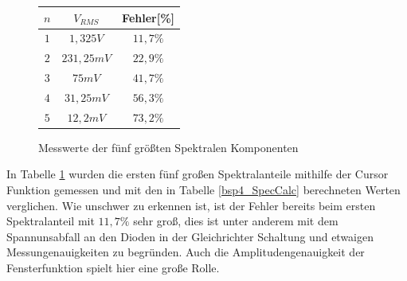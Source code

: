 \begin{figure}[H]
  \begin{center}
    \begin{tabular}{|c|c|c|} \hline
    $n$ & $V_{RMS}$ & Fehler[\%] \\ \hline
    $1$ & $1,325V$    & $11,7\%$\\ \hline
    $2$ & $231,25mV$  & $22,9\%$\\ \hline
    $3$ & $75mV$      & $41,7\%$\\ \hline
    $4$ & $31,25mV$   & $56,3\%$\\ \hline
    $5$ & $12,2mV$    & $73,2\%$\\ \hline
    \end{tabular}
  \end{center}
  \caption{Messwerte der f\"unf gr\"o\ss{}ten Spektralen Komponenten} \label{bsp4_SpecMess}
\end{figure}
\noindent
In Tabelle \ref{bsp4_SpecMess} wurden die ersten f\"unf gro\ss{}en Spektralanteile mithilfe der Cursor Funktion gemessen und mit den in Tabelle \ref{bsp4_SpecCalc} berechneten Werten verglichen. Wie unschwer zu erkennen ist, ist der Fehler bereits beim ersten Spektralanteil mit $11,7\%$ sehr gro\ss{}, dies ist unter anderem mit dem Spannunsabfall an den Dioden in der Gleichrichter Schaltung und etwaigen Messungenauigkeiten zu begr\"unden. Auch die Amplitudengenauigkeit der Fensterfunktion spielt hier eine große Rolle.
